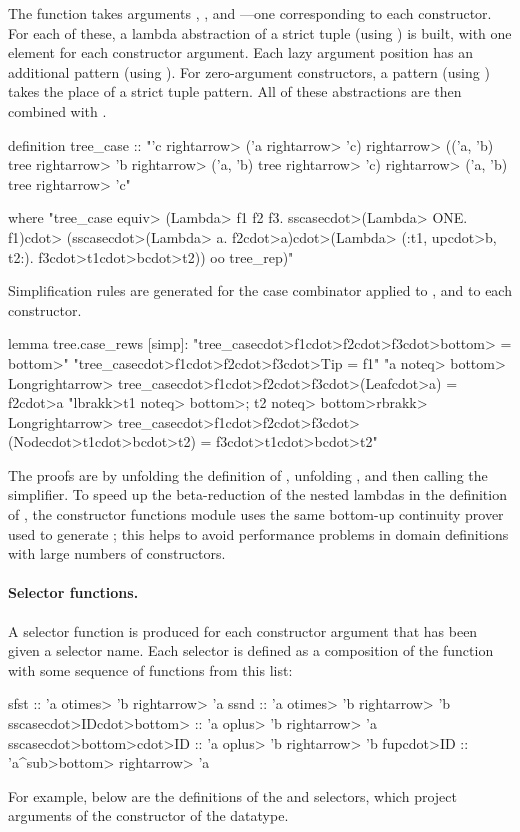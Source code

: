 The  function takes arguments , , and ---one corresponding to each constructor. For each of these, a lambda abstraction of a strict tuple (using ) is built, with one element for each constructor argument. Each lazy argument position has an additional  pattern (using ). For zero-argument constructors, a  pattern (using ) takes the place of a strict tuple pattern. All of these abstractions are then combined with .
%
\begin{isacode}
definition tree_case :: "'c \<rightarrow> ('a \<rightarrow> 'c)
    \<rightarrow> (('a, 'b) tree \<rightarrow> 'b \<rightarrow> ('a, 'b) tree \<rightarrow> 'c) \<rightarrow> ('a, 'b) tree \<rightarrow> 'c"
\end{isacode}
\pagebreak
\begin{isacode}
  where "tree_case \<equiv> (\<Lambda> f1 f2 f3. sscase\<cdot>(\<Lambda> ONE. f1)\<cdot>
    (sscase\<cdot>(\<Lambda> a. f2\<cdot>a)\<cdot>(\<Lambda> (:t1, up\<cdot>b, t2:). f3\<cdot>t1\<cdot>b\<cdot>t2)) oo tree_rep)"
\end{isacode}
%
Simplification rules are generated for the case combinator applied to , and to each constructor.
%
\begin{isacode}
lemma tree.case_rews [simp]:
  "tree_case\<cdot>f1\<cdot>f2\<cdot>f3\<cdot>\<bottom> = \<bottom>"
  "tree_case\<cdot>f1\<cdot>f2\<cdot>f3\<cdot>Tip = f1"
  "a \<noteq> \<bottom> \<Longrightarrow> tree_case\<cdot>f1\<cdot>f2\<cdot>f3\<cdot>(Leaf\<cdot>a) = f2\<cdot>a
  "\<lbrakk>t1 \<noteq> \<bottom>; t2 \<noteq> \<bottom>\<rbrakk> \<Longrightarrow> tree_case\<cdot>f1\<cdot>f2\<cdot>f3\<cdot>(Node\<cdot>t1\<cdot>b\<cdot>t2) = f3\<cdot>t1\<cdot>b\<cdot>t2"
\end{isacode}
%
The proofs are by unfolding the definition of , unfolding , and then calling the simplifier. To speed up the beta-reduction of the nested lambdas in the definition of , the constructor functions module uses the same bottom-up continuity prover used to generate ; this helps to avoid performance problems in domain definitions with large numbers of constructors.

\paragraph{Selector functions.}

A selector function is produced for each constructor argument that has been given a selector name. Each selector is defined as a composition of the  function with some sequence of functions from this list:
%
\begin{isacode}
sfst :: 'a \<otimes> 'b \<rightarrow> 'a
ssnd :: 'a \<otimes> 'b \<rightarrow> 'b
sscase\<cdot>ID\<cdot>\<bottom> :: 'a \<oplus> 'b \<rightarrow> 'a
sscase\<cdot>\<bottom>\<cdot>ID :: 'a \<oplus> 'b \<rightarrow> 'b
fup\<cdot>ID :: 'a\<^sub>\<bottom> \<rightarrow> 'a
\end{isacode}
%
For example, below are the definitions of the  and  selectors, which project arguments of the  constructor of the  datatype.

